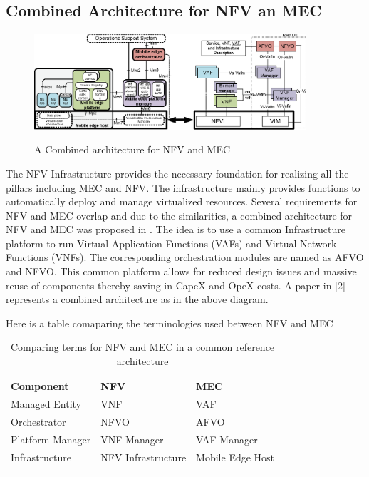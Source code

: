 \subsection{Combined Architecture for NFV an MEC}

\begin{figure}[ht!]
    \centering
    \includegraphics[width=0.9\textwidth]{images/combined_architecture}
    \label{fig:figure6}
    \caption{A Combined architecture for NFV and MEC \protect\cite{taleb17}}
\end{figure}

The NFV Infrastructure provides the necessary foundation for realizing all the pillars including MEC and NFV\@. The infrastructure mainly provides functions to automatically deploy and manage virtualized resources. Several requirements for NFV and MEC overlap and due to the similarities, a combined architecture for NFV and MEC was proposed in \cite{taleb17}. The idea is to use a common Infrastructure platform to run Virtual Application Functions (VAFs) and Virtual Network Functions (VNFs). The corresponding orchestration modules are named as AFVO and NFVO\@. This common platform allows for reduced design issues and massive reuse of components thereby saving in CapeX and OpeX costs. A paper in [2] represents a combined architecture as in the above diagram.


Here is a table comaparing the terminologies used between NFV and MEC

\begin{longtable}{||p{}|p{}|p{}||}
\hline\hline
\textbf{Component}&\textbf{NFV}&\textbf{MEC} \\
\hline
Managed Entity&VNF&VAF \\
\hline
Orchestrator&NFVO&AFVO \\
\hline
Platform Manager&VNF Manager&VAF Manager \\
\hline
Infrastructure&NFV Infrastructure&Mobile Edge Host \\
\hline\hline
\label{tab:tab2}
\caption{Comparing terms for NFV and MEC in a common reference architecture \cite{taleb17}}
\end{longtable}
